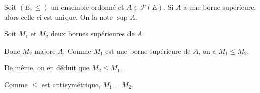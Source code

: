 \begin{prop}
	Soit $(E, \le)$ un ensemble ordonné et $A \in \mathcal{P}(E)$. Si $A$ a une borne supérieure, alors celle-ci est unique. On la note $\sup A$.
\end{prop}

\begin{prv}
	Soit $M_1$ et $M_2$ deux bornes supérieures de $A$.

	Donc $M_2$ majore $A$. Comme $M_1$ est une borne supérieure de $A$, on a $M_1\le M_2$.

	De même, on en déduit que $M_2 \le M_1$.

	Comme $\le$ est antisymétrique, $M_1 = M_2$.
\end{prv}

